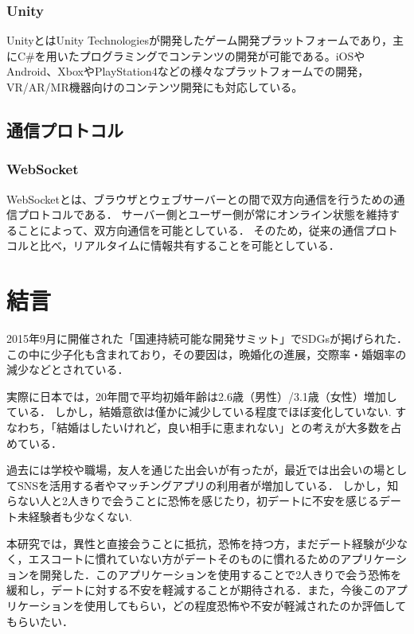 \documentclass[12pt,a4j,titlepage]{ltjsarticle}
\begin{document}
\subsubsection{Unity}
UnityとはUnity Technologiesが開発したゲーム開発プラットフォームであり，主にC\#を用いたプログラミングでコンテンツの開発が可能である。iOSやAndroid、XboxやPlayStation4などの様々なプラットフォームでの開発，VR/AR/MR機器向けのコンテンツ開発にも対応している。

\subsection{通信プロトコル}
\subsubsection{WebSocket}
WebSocketとは、ブラウザとウェブサーバーとの間で双方向通信を行うための通信プロトコルである．
サーバー側とユーザー側が常にオンライン状態を維持することによって、双方向通信を可能としている．
そのため，従来の通信プロトコルと比べ，リアルタイムに情報共有することを可能としている．
\clearpage

\section{結言}
2015年9月に開催された「国連持続可能な開発サミット」でSDGsが掲げられた．この中に少子化も含まれており，その要因は，晩婚化の進展\cite{sasaki2012}，交際率・婚姻率の減少\cite{naikakufu2019}などとされている．

実際に日本では，20年間で平均初婚年齢は2.6歳（男性）/3.1歳（女性）増加している．
しかし，結婚意欲は僅かに減少している程度でほぼ変化していない.
すなわち，「結婚はしたいけれど，良い相手に恵まれない」との考えが大多数を占めている\cite{naikakufu2019}．

過去には学校や職場，友人を通じた出会いが有ったが，最近では出会いの場としてSNSを活用する者やマッチングアプリの利用者が増加している．
しかし，知らない人と2人きりで会うことに恐怖を感じたり，初デートに不安を感じるデート未経験者も少なくない\cite{prtimes,yoshimura2020}.

本研究では，異性と直接会うことに抵抗，恐怖を持つ方，まだデート経験が少なく，エスコートに慣れていない方がデートそのものに慣れるためのアプリケーションを開発した．このアプリケーションを使用することで2人きりで会う恐怖を緩和し，デートに対する不安を軽減することが期待される．また，今後このアプリケーションを使用してもらい，どの程度恐怖や不安が軽減されたのか評価してもらいたい．
\end{document}
